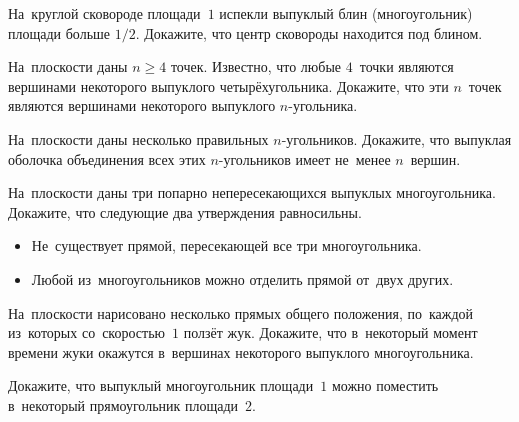 


\begin{problems}

\item
На~круглой сковороде площади~$1$ испекли выпуклый блин (многоугольник) площади
больше $1/2$.
Докажите, что центр сковороды находится под блином.

\item
На~плоскости даны $n \geq 4$ точек.
Известно, что любые $4$~точки являются вершинами некоторого выпуклого
четырёхугольника.
Докажите, что эти $n$~точек являются вершинами некоторого выпуклого
$n$-угольника.

\item
На~плоскости даны несколько правильных $n$-угольников.
Докажите, что выпуклая оболочка объединения всех этих $n$-угольников имеет
не~менее $n$~вершин.


\item
На~плоскости даны три попарно непересекающихся выпуклых многоугольника.
Докажите, что следующие два утверждения равносильны.
\begin{itemize}\parskip=0.5ex
\item
Не~существует прямой, пересекающей все три многоугольника.
\item
Любой из~многоугольников можно отделить прямой от~двух других.
\end{itemize}

\item
На~плоскости нарисовано несколько прямых общего положения, по~каждой из~которых
со~скоростью~$1$ ползёт жук.
Докажите, что в~некоторый момент времени жуки окажутся в~вершинах некоторого
выпуклого многоугольника.

\item
Докажите, что выпуклый многоугольник площади~$1$ можно поместить в~некоторый
прямоугольник площади~$2$.


\end{problems}
